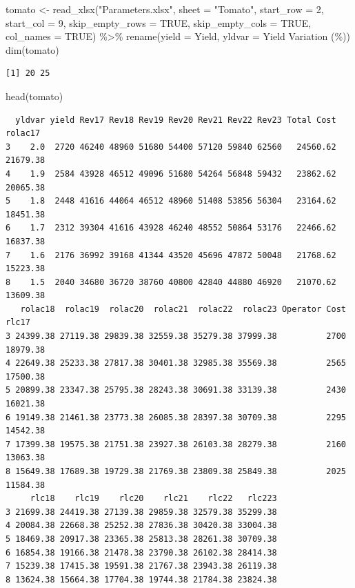 \documentclass[
  letterpaper,
  DIV=11,
  numbers=noendperiod]{scrartcl}
\newenvironment{Shaded}{\begin{snugshade}}{\end{snugshade}}
\newcommand{\AttributeTok}[1]{\textcolor[rgb]{0.40,0.45,0.13}{#1}}
\newcommand{\ConstantTok}[1]{\textcolor[rgb]{0.56,0.35,0.01}{#1}}
\newcommand{\DecValTok}[1]{\textcolor[rgb]{0.68,0.00,0.00}{#1}}
\newcommand{\FunctionTok}[1]{\textcolor[rgb]{0.28,0.35,0.67}{#1}}
\newcommand{\NormalTok}[1]{\textcolor[rgb]{0.00,0.23,0.31}{#1}}
\newcommand{\OtherTok}[1]{\textcolor[rgb]{0.00,0.23,0.31}{#1}}
\newcommand{\SpecialCharTok}[1]{\textcolor[rgb]{0.37,0.37,0.37}{#1}}
\newcommand{\StringTok}[1]{\textcolor[rgb]{0.13,0.47,0.30}{#1}}
\begin{document}
\begin{Shaded}
\begin{Highlighting}[]
\NormalTok{tomato }\OtherTok{\textless{}{-}} \FunctionTok{read\_xlsx}\NormalTok{(}\StringTok{"Parameters.xlsx"}\NormalTok{,}
                    \AttributeTok{sheet =} \StringTok{"Tomato"}\NormalTok{,}
                    \AttributeTok{start\_row =} \DecValTok{2}\NormalTok{,}
                    \AttributeTok{start\_col =} \DecValTok{9}\NormalTok{,}
                    \AttributeTok{skip\_empty\_rows =} \ConstantTok{TRUE}\NormalTok{,}
                    \AttributeTok{skip\_empty\_cols =} \ConstantTok{TRUE}\NormalTok{,}
                    \AttributeTok{col\_names =} \ConstantTok{TRUE}\NormalTok{) }\SpecialCharTok{\%\textgreater{}\%} 
  \FunctionTok{rename}\NormalTok{(}\AttributeTok{yield =}\NormalTok{ Yield,}
         \AttributeTok{yldvar =} \StringTok{\textasciigrave{}}\AttributeTok{Yield Variation (\%)}\StringTok{\textasciigrave{}}\NormalTok{)}
\FunctionTok{dim}\NormalTok{(tomato)}
\end{Highlighting}
\end{Shaded}

\begin{verbatim}
[1] 20 25
\end{verbatim}

\begin{Shaded}
\begin{Highlighting}[]
\FunctionTok{head}\NormalTok{(tomato)}
\end{Highlighting}
\end{Shaded}

\begin{verbatim}
  yldvar yield Rev17 Rev18 Rev19 Rev20 Rev21 Rev22 Rev23 Total Cost  rolac17
3    2.0  2720 46240 48960 51680 54400 57120 59840 62560   24560.62 21679.38
4    1.9  2584 43928 46512 49096 51680 54264 56848 59432   23862.62 20065.38
5    1.8  2448 41616 44064 46512 48960 51408 53856 56304   23164.62 18451.38
6    1.7  2312 39304 41616 43928 46240 48552 50864 53176   22466.62 16837.38
7    1.6  2176 36992 39168 41344 43520 45696 47872 50048   21768.62 15223.38
8    1.5  2040 34680 36720 38760 40800 42840 44880 46920   21070.62 13609.38
   rolac18  rolac19  rolac20  rolac21  rolac22  rolac23 Operator Cost    rlc17
3 24399.38 27119.38 29839.38 32559.38 35279.38 37999.38          2700 18979.38
4 22649.38 25233.38 27817.38 30401.38 32985.38 35569.38          2565 17500.38
5 20899.38 23347.38 25795.38 28243.38 30691.38 33139.38          2430 16021.38
6 19149.38 21461.38 23773.38 26085.38 28397.38 30709.38          2295 14542.38
7 17399.38 19575.38 21751.38 23927.38 26103.38 28279.38          2160 13063.38
8 15649.38 17689.38 19729.38 21769.38 23809.38 25849.38          2025 11584.38
     rlc18    rlc19    rlc20    rlc21    rlc22   rlc223
3 21699.38 24419.38 27139.38 29859.38 32579.38 35299.38
4 20084.38 22668.38 25252.38 27836.38 30420.38 33004.38
5 18469.38 20917.38 23365.38 25813.38 28261.38 30709.38
6 16854.38 19166.38 21478.38 23790.38 26102.38 28414.38
7 15239.38 17415.38 19591.38 21767.38 23943.38 26119.38
8 13624.38 15664.38 17704.38 19744.38 21784.38 23824.38
\end{verbatim}
\end{document}
